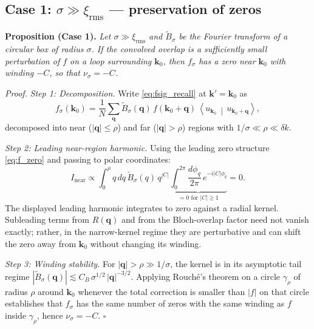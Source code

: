 \documentclass[aps,prb,onecolumn,nofootinbib,superscriptaddress]{revtex4-2}
\newcommand{\mbf}[1]{\mathbf{#1}}
\newcommand{\braket}[2]{\left\langle#1\,\middle|\,#2\right\rangle}
\begin{document}
\subsection{Case 1: \texorpdfstring{$\sigma \gg \xi_{\mathrm{rms}}$}{sigma much greater than xi-rms} --- preservation of zeros}

\noindent\textbf{Proposition (Case 1).} \emph{Let $\sigma \gg \xi_{\mathrm{rms}}$ and $\widetilde{B}_\sigma$ be the Fourier transform of a circular box of radius $\sigma$. If the convolved overlap is a sufficiently small perturbation of $f$ on a loop surrounding $\mbf{k}_0$, then $f_\sigma$ has a zero near $\mbf{k}_0$ with winding $-C$, so that $\nu_\sigma=-C$.}

\medskip
\noindent\emph{Proof.}
\textit{Step 1: Decomposition.} Write \eqref{eq:fsig_recall} at $\mbf{k}'=\mbf{k}_0$ as
\begin{equation}\label{eq:fsig_k0}
f_\sigma(\mbf{k}_0) = \frac{1}{N}\sum_{\mbf{q}} \widetilde{B}_\sigma(\mbf{q})\, f(\mbf{k}_0 + \mbf{q})\,\braket{u_{\mbf{k}_0}}{u_{\mbf{k}_0+\mbf{q}}},
\end{equation}
decomposed into near ($|\mbf{q}|\leq\rho$) and far ($|\mbf{q}|>\rho$) regions with $1/\sigma \ll \rho \ll \delta k$.

\textit{Step 2: Leading near-region harmonic.} Using the leading zero structure \eqref{eq:f_zero} and passing to polar coordinates:
\begin{equation}\label{eq:angular_integral}
I_{\text{near}} \propto \int_0^\rho q\,dq\,\widetilde{B}_\sigma(q)\,q^{|C|} \underbrace{\int_0^{2\pi}\frac{d\phi_q}{2\pi}\, e^{-i|C|\phi_q}}_{= 0 \text{ for } |C|\geq 1} = 0.
\end{equation}
The displayed leading harmonic integrates to zero against a radial kernel.  Subleading terms from $R(\mbf{q})$ and from the Bloch-overlap factor need not vanish exactly; rather, in the narrow-kernel regime they are perturbative and can shift the zero away from $\mbf{k}_0$ without changing its winding.

\textit{Step 3: Winding stability.} For $|\mbf{q}|>\rho\gg 1/\sigma$, the kernel is in its asymptotic tail regime $|\widetilde{B}_\sigma(\mbf{q})| \lesssim C_B\,\sigma^{1/2}\,|\mbf{q}|^{-3/2}$. Applying Rouch\'{e}'s theorem on a circle $\gamma_\rho$ of radius $\rho$ around $\mbf{k}_0$ whenever the total correction is smaller than $|f|$ on that circle establishes that $f_\sigma$ has the same number of zeros with the same winding as $f$ inside $\gamma_\rho$, hence $\nu_\sigma=-C$. $\square$
\end{document}

